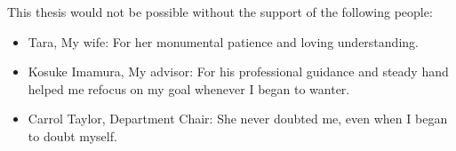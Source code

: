 This thesis would not be possible without the support of the following people:

\begin{itemize}
    \item Tara, My wife:  For her monumental patience and loving understanding.
    \item Kosuke Imamura, My advisor:  For his professional guidance and steady hand helped me refocus on my goal whenever I began to wanter.
    \item Carrol Taylor, Department Chair:  She never doubted me, even when I began to doubt myself.
\end{itemize}
